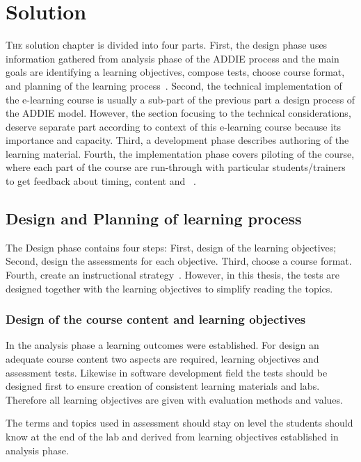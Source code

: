 \chapter{Solution}
\label{solution}
\lettrine[lraise=0.1, nindent=0em, slope=-.5em]{\color{Violet}T}{he} solution chapter is divided into four parts. First, the design phase uses information gathered from analysis phase of the \gls{ADDIE} process and the main goals are identifying  a learning objectives, compose tests, choose course format, and planning of the learning process~\citep{website:design_phase_ADDIE}. Second, the technical implementation of the e-learning course is usually a sub-part of the previous part a design process of the \gls{ADDIE} model. However, the section focusing to the technical considerations, deserve separate part according to context of this e-learning course because its importance and capacity. Third, a development phase describes authoring of the learning material. Fourth, the implementation phase covers piloting of the course, where each part of the course are run-through with particular students/trainers to get feedback about timing, content and ~\citep{website:design_phase_ADDIE}.



 
\section{Design and Planning of learning process}
The Design phase contains four steps: First, design of the learning objectives; Second, design the assessments for each objective. Third, choose a course format. Fourth, create an instructional strategy~\citep{website:design_phase_ADDIE}. However, in this thesis, the tests are designed together with the learning objectives to simplify reading the topics.

\subsection{Design of the course content and learning objectives}

In the analysis phase a learning outcomes were established. For design an adequate course content two aspects are required, learning objectives and assessment tests. Likewise in software development field the tests should be designed first to ensure creation of consistent learning materials and labs. Therefore all learning objectives are given with evaluation methods and values.  

The terms and topics used in assessment should stay on level the students should know at the end of the lab and derived from learning objectives established in analysis phase.

